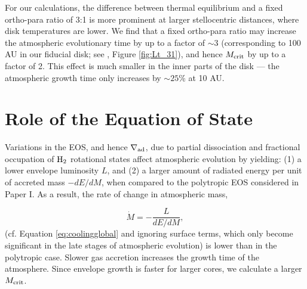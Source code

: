 


For our calculations, the difference between thermal equilibrium and a fixed ortho-para ratio of 3:1 is more prominent at larger stellocentric distances, where disk temperatures are lower. We find  that a fixed ortho-para ratio may increase the atmospheric evolutionary time by up to a factor of $\sim$$3$ (corresponding to 100 AU in our fiducial disk; see , Figure \ref{fig:Lt_31}), and hence $M_{\rm crit}$ by up to a factor of 2. This effect is much smaller in the inner parts of the disk --- the atmospheric growth time only increases by $\sim$$25$\% at 10 AU.

 





\section{Role of the Equation of State}
\label{EOSeffects}

Variations in the EOS, and hence $\nabla_{\rm ad}$, due to partial dissociation and fractional occupation of $\rm{H}_2$ rotational states affect atmospheric evolution by yielding: (1) a lower envelope luminosity $L$, and (2) a larger amount of radiated energy per unit of accreted mass $-dE/dM$, when compared to the polytropic EOS considered in Paper I. As a result, the rate of change in atmospheric mass,

\begin{equation}
\label{eq:dMdt}
\dot{M} = -\frac{L}{dE/dM},
\end{equation}
(cf. Equation \ref{eq:coolingglobal} and ignoring surface terms, which only become significant in the late stages of atmospheric evolution) is lower than in the polytropic case. Slower gas accretion increases the growth time of the atmosphere. Since envelope growth is faster for larger cores, we calculate a larger $M_{\rm crit}$. %

